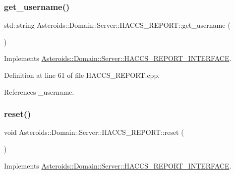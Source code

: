 \subsubsection{\texorpdfstring{get\+\_\+username()}{get\_username()}}
{\footnotesize\ttfamily std\+::string Asteroids\+::\+Domain\+::\+Server\+::\+H\+A\+C\+C\+S\+\_\+\+R\+E\+P\+O\+R\+T\+::get\+\_\+username (\begin{DoxyParamCaption}{ }\end{DoxyParamCaption})\hspace{0.3cm}{\ttfamily [virtual]}}



Implements \hyperlink{classAsteroids_1_1Domain_1_1Server_1_1HACCS__REPORT__INTERFACE_a74bc89d7ffac8ef6825fa08a136ea818}{Asteroids\+::\+Domain\+::\+Server\+::\+H\+A\+C\+C\+S\+\_\+\+R\+E\+P\+O\+R\+T\+\_\+\+I\+N\+T\+E\+R\+F\+A\+CE}.



Definition at line 61 of file H\+A\+C\+C\+S\+\_\+\+R\+E\+P\+O\+R\+T.\+cpp.



References \+\_\+username.

\mbox{\label{classAsteroids_1_1Domain_1_1Server_1_1HACCS__REPORT_a8ac70a5b53e7c93a8cefd963c35f3efa}} 
\subsubsection{\texorpdfstring{reset()}{reset()}}
{\footnotesize\ttfamily void Asteroids\+::\+Domain\+::\+Server\+::\+H\+A\+C\+C\+S\+\_\+\+R\+E\+P\+O\+R\+T\+::reset (\begin{DoxyParamCaption}{ }\end{DoxyParamCaption})\hspace{0.3cm}{\ttfamily [virtual]}}



Implements \hyperlink{classAsteroids_1_1Domain_1_1Server_1_1HACCS__REPORT__INTERFACE_a910f7fdcd75d49a01cea298881a7e089}{Asteroids\+::\+Domain\+::\+Server\+::\+H\+A\+C\+C\+S\+\_\+\+R\+E\+P\+O\+R\+T\+\_\+\+I\+N\+T\+E\+R\+F\+A\+CE}.




